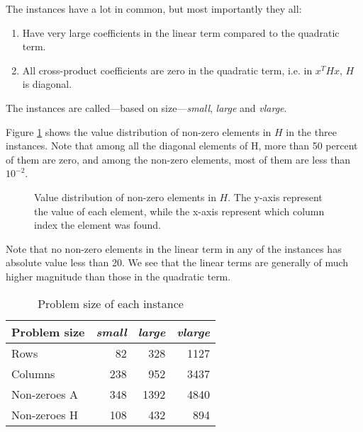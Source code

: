The instances have a lot in common, but most importantly they all:
\begin{enumerate}
\item Have very large coefficients in the linear term compared to the
quadratic term.
\item All cross-product coefficients are zero in the quadratic term, i.e. in
$x^T H x$, $H$ is diagonal.
\end{enumerate}

The instances are called---based on size---\textit{small}, \textit{large}
and \textit{vlarge}.

Figure \ref{fig:histH} shows the value distribution of non-zero elements in $H$
in the three instances. Note that among all the diagonal elements of H, more
than 50 percent of them are zero, and among the non-zero elements, most of them
are less than $10^{-2}$.
\begin{figure}[h!]
\begin{center}

\end{center}
\caption{Value distribution of non-zero elements in $H$. The y-axis represent
the value of each element, while the x-axis represent which column index the
element was found.}
\label{fig:histH}
\end{figure}
Note that no non-zero elements in the linear term in any of the instances
has absolute value less than 20. We see that the linear terms are generally
of much higher magnitude than those in the quadratic term.

\begin{table}[h!]
    \centering
    \caption{Problem size of each instance}
    \begin{tabular}{lrrr}
    Problem size & \textit{small} & \textit{large} & \textit{vlarge} \\\hline
    Rows         & 82             & 328            & 1127 \\
    Columns      & 238            & 952            & 3437 \\
    Non-zeroes A & 348            & 1392           & 4840 \\
    Non-zeroes H & 108            & 432            & 894 \\
    \end{tabular}
    \label{table:sizes}
\end{table}

